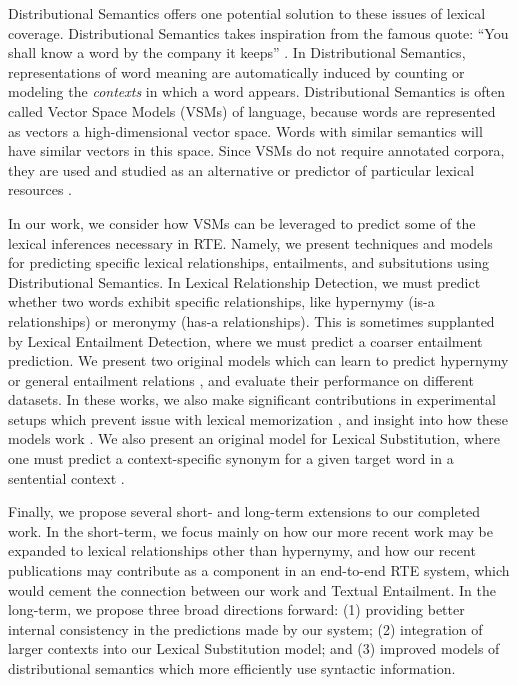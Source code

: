 \documentclass[12pt]{article}
\begin{document}
Distributional Semantics offers one potential solution to these issues of lexical
coverage. Distributional Semantics takes inspiration from the famous quote:
``You shall know a word by the company it keeps'' \cite{firth:1957:la}. In
Distributional Semantics, representations of word meaning are automatically
induced by counting or modeling the {\em contexts} in which a word appears.
Distributional Semantics is often called Vector Space Models (VSMs) of
language, because words are represented as vectors a high-dimensional vector space.
Words with similar semantics will have similar vectors in this
space. Since VSMs do not require annotated corpora, they are used and
studied as an alternative or predictor of particular lexical resources
\cite{baroni:2012:eacl,erk:2008:emnlp,turney:2010:jair}.

In our work, we consider how VSMs
can be leveraged to predict some of the lexical inferences necessary in RTE.
Namely, we present techniques and models for predicting specific
lexical relationships, entailments, and subsitutions using Distributional
Semantics. In Lexical Relationship Detection, we must
predict whether two words exhibit specific relationships, like hypernymy (is-a
relationships) or meronymy (has-a relationships). This is sometimes supplanted
by Lexical Entailment Detection, where we must predict a coarser entailment
prediction. We present two original models which can learn to predict hypernymy
or general entailment relations
\cite{roller:2014:coling,beltagy:2016:cl,roller:2016:emnlp}, and evaluate their
performance on different datasets. In these works, we also make significant
contributions in experimental setups which prevent issue with lexical
memorization \cite{roller:2014:coling}, and insight into how these models
work \cite{roller:2016:emnlp}.  We also present an original model for Lexical
Substitution, where one must predict a context-specific synonym for a given
target word in a sentential context \cite{roller:2016:naacl}.

Finally, we propose several short- and long-term extensions to our completed
work. In the short-term, we focus mainly on how our more recent work may be
expanded to lexical relationships other than hypernymy, and how our recent
publications may  contribute as a component in an end-to-end RTE system, which
would cement the connection between our work and Textual Entailment. In the
long-term, we propose three broad directions forward: (1) providing better
internal consistency in the predictions made by our system; (2) integration
of larger contexts into our Lexical Substitution model; and (3) improved
models of distributional semantics which more efficiently use syntactic
information.
\end{document}
